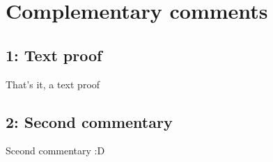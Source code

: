 \chapter[Ordered by reference]{Complementary comments}

\section {1: Text proof}

That's it, a text proof

\newpage

\section {2: Second commentary}

Sceond commentary :D

\newpage